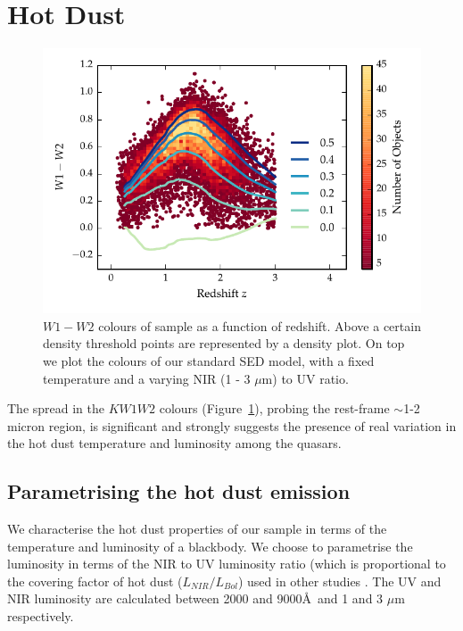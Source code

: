 \section{Hot Dust}

\begin{figure}
\centering
\includegraphics[width=\columnwidth]{figures/chapter05/w1w2_versus_redshift_ratio.pdf}
\caption{$W1 - W2$ colours of sample as a function of redshift. Above a certain density threshold points are represented by a density plot. On top we plot the colours of our standard \ac{SED} model, with a fixed temperature and a varying \ac{NIR} (1 - 3 $\mu$m) to UV ratio.}
  \label{fig:w1w2colorsratio}
\end{figure}

The spread in the $KW1W2$ colours (Figure~\ref{fig:w1w2colorsratio}), probing the rest-frame $\sim$1-2 micron region, is significant and strongly suggests the presence of real variation in the hot dust temperature and luminosity among the quasars. 

\subsection{Parametrising the hot dust emission}

We characterise the hot dust properties of our sample in terms of the temperature and luminosity of a blackbody.  
We choose to parametrise the luminosity in terms of the \ac{NIR} to UV luminosity ratio (which is proportional to the covering factor of hot dust ($L_{NIR}/L_{Bol}$) used in other studies \citep{roseboom13}. 
The UV and \ac{NIR} luminosity are calculated between 2000 and 9000\AA\, and 1 and 3 $\mu$m respectively.

